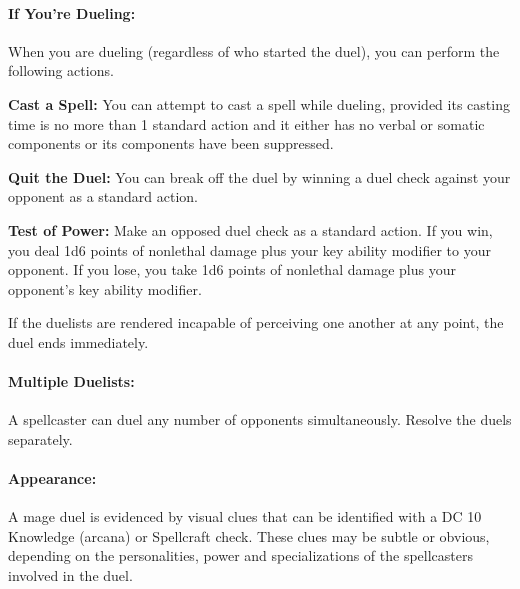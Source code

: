 \paragraph{If You're Dueling:} When you are dueling (regardless of who started the duel), you can perform the following actions.
\begin{list}{}{\leftmargin=1em}
 \item \textbf{Cast a Spell:} You can attempt to cast a spell while dueling, provided its casting time is no more than 1 standard action and it either has no verbal or somatic components or its components have been suppressed.
 \item \textbf{Quit the Duel:} You can break off the duel by winning a duel check against your opponent as a standard action.
 \item \textbf{Test of Power:} Make an opposed duel check as a standard action. If you win, you deal 1d6 points of nonlethal damage plus your key ability modifier to your opponent. If you lose, you take 1d6 points of nonlethal damage plus your opponent's key ability modifier.
\end{list}
If the duelists are rendered incapable of perceiving one another at any point, the duel ends immediately.
\paragraph{Multiple Duelists:} A spellcaster can duel any number of opponents simultaneously. Resolve the duels separately.
\paragraph{Appearance:} A mage duel is evidenced by visual clues that can be identified with a DC 10 Knowledge (arcana) or Spellcraft check. These clues may be subtle or obvious, depending on the personalities, power and specializations of the spellcasters involved in the duel.
